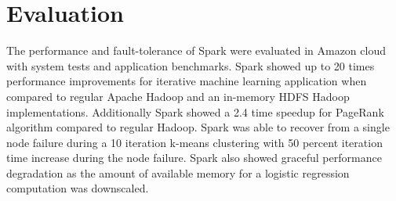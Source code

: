 \chapter{Evaluation\label{results}}

The performance and fault-tolerance of Spark were evaluated in Amazon cloud with system tests and application
benchmarks. Spark showed up to 20 times performance improvements for iterative machine learning application when
compared to regular Apache Hadoop and an in-memory HDFS Hadoop implementations. Additionally Spark showed a 2.4
time speedup for PageRank algorithm compared to regular Hadoop. Spark was able to recover from a single node failure
during a 10 iteration k-means clustering with 50 percent iteration time increase during the node failure. Spark also
showed graceful performance degradation as the amount of available memory for a logistic regression computation was
downscaled.
